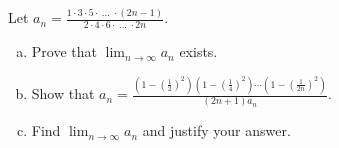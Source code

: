 Let $\displaystyle{
    a_n = \frac{1 \cdot 3 \cdot 5 \cdot \ ... \ \cdot (2n - 1)}
               {2 \cdot 4 \cdot 6 \cdot \ ... \ \cdot 2n}
}$.

\begin{enumerate}[(a)]

\item Prove that $\displaystyle{\lim_{n \to \infty} a_n}$ exists.
\item Show that $\displaystyle{
          a_n = \frac{\left( 1 - \left( \frac{1}{2}  \right)^2 \right)
                      \left( 1 - \left( \frac{1}{4}  \right)^2 \right)
                      \cdots
                      \left( 1 - \left( \frac{1}{2n} \right)^2 \right)}
                     {(2n + 1)a_n}
      }$.
\item Find $\displaystyle{\lim_{n \to \infty} a_n}$ and justify your answer.

\end{enumerate}
